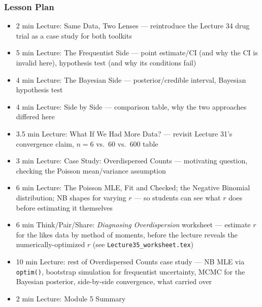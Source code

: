\begin{frame}
    \frametitle{Lesson Plan}
    \begin{itemize}
        \item 2 min Lecture: Same Data, Two Lenses --- reintroduce the Lecture 34 drug trial as a case study for both toolkits
        \item 5 min Lecture: The Frequentist Side --- point estimate/CI (and why the CI is invalid here), hypothesis test (and why its conditions fail)
        \item 4 min Lecture: The Bayesian Side --- posterior/credible interval, Bayesian hypothesis test
        \item 4 min Lecture: Side by Side --- comparison table, why the two approaches differed here
        \item 3.5 min Lecture: What If We Had More Data? --- revisit Lecture 31's convergence claim, $n=6$ vs.\ $60$ vs.\ $600$ table
        \item 3 min Lecture: Case Study: Overdispersed Counts --- motivating question, checking the Poisson mean/variance assumption
        \item 6 min Lecture: The Poisson MLE, Fit and Checked; the Negative Binomial distribution; NB shapes for varying $r$ --- so students can see what $r$ does before estimating it themselves
        \item 6 min Think/Pair/Share: \textit{Diagnosing Overdispersion} worksheet --- estimate $r$ for the likes data by method of moments, before the lecture reveals the numerically-optimized $\hat r$ (see \texttt{Lecture35\_worksheet.tex})
        \item 10 min Lecture: rest of Overdispersed Counts case study --- NB MLE via \texttt{optim()}, bootstrap simulation for frequentist uncertainty, MCMC for the Bayesian posterior, side-by-side convergence, what carried over
        \item 2 min Lecture: Module 5 Summary
    \end{itemize}
\end{frame}





